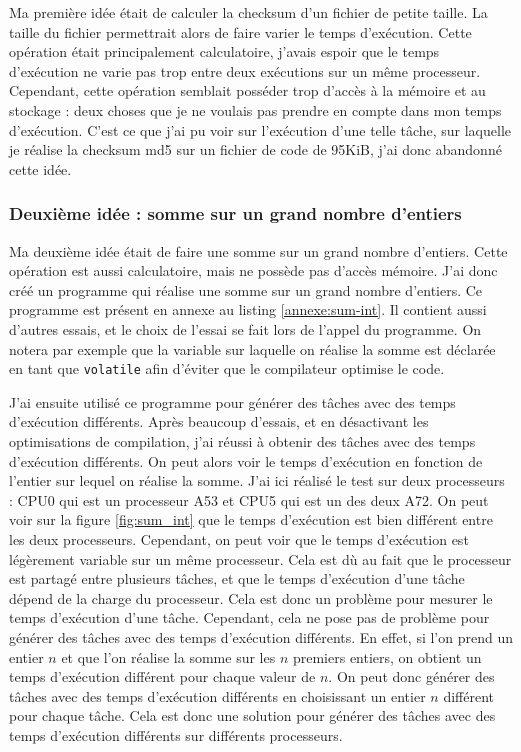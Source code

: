 Ma première idée était de calculer la checksum d'un fichier de petite taille. La taille du fichier permettrait alors de faire varier le temps d'exécution. Cette opération était principalement calculatoire, j'avais espoir que le temps d'exécution ne varie pas trop entre deux exécutions sur un même processeur. Cependant, cette opération semblait posséder trop d'accès à la mémoire et au stockage : deux choses que je ne voulais pas prendre en compte dans mon temps d'exécution. C'est ce que j'ai pu voir sur l'exécution d'une telle tâche, sur laquelle je réalise la \gls{checksum md5} sur un fichier de code de 95KiB, j'ai donc abandonné cette idée.

\subsubsection{Deuxième idée : somme sur un grand nombre d'entiers}

Ma deuxième idée était de faire une somme sur un grand nombre d'entiers. Cette opération est aussi calculatoire, mais ne possède pas d'accès mémoire. J'ai donc créé un programme qui réalise une somme sur un grand nombre d'entiers. Ce programme est présent en annexe au listing \ref{annexe:sum-int}. Il contient aussi d'autres essais, et le choix de l'essai se fait lors de l'appel du programme. On notera par exemple que la variable sur laquelle on réalise la somme est déclarée en tant que \texttt{volatile} afin d'éviter que le compilateur optimise le code.

J'ai ensuite utilisé ce programme pour générer des tâches avec des temps d'exécution différents. Après beaucoup d'essais, et en désactivant les optimisations de compilation, j'ai réussi à obtenir des tâches avec des temps d'exécution différents. On peut alors voir le temps d'exécution en fonction de l'entier sur lequel on réalise la somme. J'ai ici réalisé le test sur deux processeurs : CPU0 qui est un processeur A53 et CPU5 qui est un des deux A72. On peut voir sur la figure \ref{fig:sum_int} que le temps d'exécution est bien différent entre les deux processeurs. Cependant, on peut voir que le temps d'exécution est légèrement variable sur un même processeur. Cela est dù au fait que le processeur est partagé entre plusieurs tâches, et que le temps d'exécution d'une tâche dépend de la charge du processeur. Cela est donc un problème pour mesurer le temps d'exécution d'une tâche. Cependant, cela ne pose pas de problème pour générer des tâches avec des temps d'exécution différents. En effet, si l'on prend un entier $n$ et que l'on réalise la somme sur les $n$ premiers entiers, on obtient un temps d'exécution différent pour chaque valeur de $n$. On peut donc générer des tâches avec des temps d'exécution différents en choisissant un entier $n$ différent pour chaque tâche. Cela est donc une solution pour générer des tâches avec des temps d'exécution différents sur différents processeurs.

